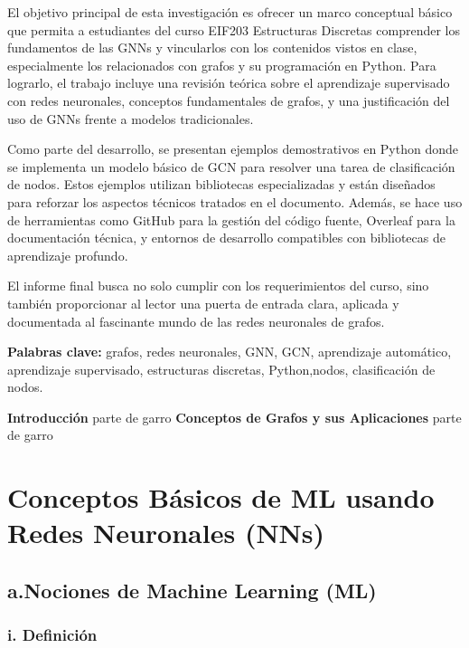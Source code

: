 \documentclass[11pt]{article} %
\begin{document}
El objetivo principal de esta investigación es ofrecer un marco conceptual básico que permita a estudiantes del curso EIF203 Estructuras Discretas comprender los fundamentos de las GNNs y vincularlos con los contenidos vistos en clase, especialmente los relacionados con grafos y su programación en Python. Para lograrlo, el trabajo incluye una revisión teórica sobre el aprendizaje supervisado con redes neuronales, conceptos fundamentales de grafos, y una justificación del uso de GNNs frente a modelos tradicionales.

Como parte del desarrollo, se presentan ejemplos demostrativos en Python donde se implementa un modelo básico de GCN para resolver una tarea de clasificación de nodos. Estos ejemplos utilizan bibliotecas especializadas y están diseñados para reforzar los aspectos técnicos tratados en el documento. Además, se hace uso de herramientas como GitHub para la gestión del código fuente, Overleaf para la documentación técnica, y entornos de desarrollo compatibles con bibliotecas de aprendizaje profundo.

El informe final busca no solo cumplir con los requerimientos del curso, sino también proporcionar al lector una puerta de entrada clara, aplicada y documentada al fascinante mundo de las redes neuronales de grafos.

\vspace{5pt}
\textbf{Palabras clave:} grafos, redes neuronales, GNN, GCN, aprendizaje automático, aprendizaje supervisado, estructuras discretas, Python,nodos, clasificación de nodos.

\newpage
\tableofcontents
\newpage
\listoftables
\listoffigures
\newpage
{\large \textbf{Introducción}}
\vspace{5pt}
parte de garro
\newpage
{\large \textbf{Conceptos de Grafos y sus Aplicaciones}}
\vspace{5pt}
parte de garro
\newpage
{\section{Conceptos Básicos de ML usando Redes Neuronales (NNs)}} \vspace{10pt}

\subsection{a.Nociones de Machine Learning (ML)}
\vspace{5pt}

\subsubsection{i. Definición} 
\vspace{3pt}
\end{document}
